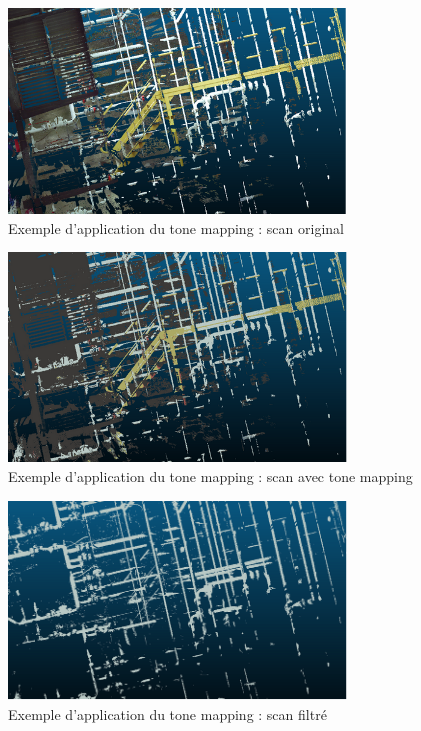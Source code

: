 \documentclass[12pt,titlepage,french]{article}
\begin{document}
\begin{figure}[H]
 \caption{\label{}  Exemple d'application du tone mapping : scan original}
 \begin{center}
 \includegraphics[width=0.8\textwidth]{./img/tm_example_1.PNG}
  \end{center}
\end{figure}

\begin{figure}[H]
 \caption{\label{}  Exemple d'application du tone mapping : scan avec tone mapping}
 \begin{center}
 \includegraphics[width=0.8\textwidth]{./img/tm_example_2.PNG}
  \end{center}
\end{figure}

\begin{figure}[H]
 \caption{\label{}  Exemple d'application du tone mapping : scan filtré}
 \begin{center}
 \includegraphics[width=0.8\textwidth]{./img/tm_example_3.PNG}
  \end{center}
\end{figure}
\end{document}
